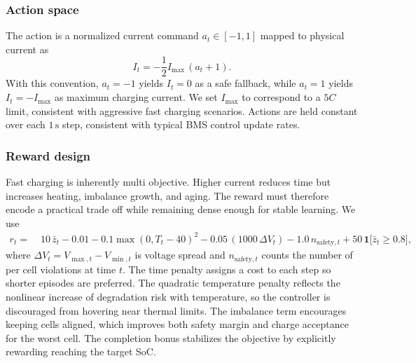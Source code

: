 \documentclass[%
 aip,
 amsmath,amssymb,
reprint, onecolumn %
]{revtex4-1}
\begin{document}
\subsubsection{Action space}
The action is a normalized current command $a_t \in [-1,1]$ mapped to physical current as
\begin{equation}
I_t = -\frac{1}{2} I_{\max}\,(a_t + 1).
\end{equation}
With this convention, $a_t=-1$ yields $I_t=0$ as a safe fallback, while $a_t=1$ yields $I_t=-I_{\max}$ as maximum charging current. We set $I_{\max}$ to correspond to a $5C$ limit, consistent with aggressive fast charging scenarios. Actions are held constant over each $1\,\mathrm{s}$ step, consistent with typical BMS control update rates.

\subsubsection{Reward design}
Fast charging is inherently multi objective. Higher current reduces time but increases heating, imbalance growth, and aging. The reward must therefore encode a practical trade off while remaining dense enough for stable learning. We use
\begin{equation}
\begin{aligned}
r_t =&\; 10\,\bar z_t
- 0.01
- 0.1\max(0,T_t - 40)^2
- 0.05\,(1000\,\Delta V_t)
- 1.0\,n_{\mathrm{safety},t}
+ 50\,\mathbf{1}\big[\bar z_t \ge 0.8\big],
\end{aligned}
\end{equation}
where $\Delta V_t = V_{\max,t} - V_{\min,t}$ is voltage spread and $n_{\mathrm{safety},t}$ counts the number of per cell violations at time $t$. The time penalty assigns a cost to each step so shorter episodes are preferred. The quadratic temperature penalty reflects the nonlinear increase of degradation risk with temperature, so the controller is discouraged from hovering near thermal limits. The imbalance term encourages keeping cells aligned, which improves both safety margin and charge acceptance for the worst cell. The completion bonus stabilizes the objective by explicitly rewarding reaching the target SoC.
\end{document}
